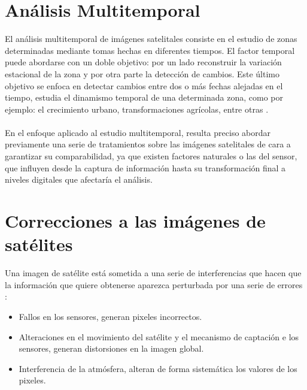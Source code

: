 \section{An\'alisis Multitemporal}
El an\'alisis multitemporal de im\'agenes satelitales consiste en el estudio de zonas determinadas mediante tomas hechas en diferentes tiempos. El factor temporal puede abordarse con un doble objetivo: por un lado reconstruir la variaci\'on estacional de la zona y por otra parte la detecci\'on de cambios. Este \'ultimo objetivo se enfoca en detectar cambios entre dos o m\'as
fechas alejadas en el tiempo, estudia el dinamismo temporal de una determinada zona, como por ejemplo: el crecimiento urbano, transformaciones agrícolas, entre otras \cite{salinero2002teledeteccion}.\\~\\
En el enfoque aplicado al estudio multitemporal, resulta preciso abordar previamente una serie de tratamientos sobre las im\'agenes satelitales de cara a garantizar su comparabilidad, ya que existen factores naturales o las del sensor, que influyen desde la captura de informaci\'on hasta su transformaci\'on final a niveles digitales que afectar\'ia el an\'alisis.

\section{Correcciones a las im\'agenes de sat\'elites}
Una imagen de sat\'elite est\'a sometida a una serie de interferencias que hacen que la informaci\'on que quiere obtenerse aparezca perturbada por una serie de errores \cite{teledUm}:
	\begin{itemize}
		\item Fallos en los sensores, generan pixeles incorrectos.
		\item Alteraciones en el movimiento del sat\'elite y el mecanismo de captaci\'on e los sensores, generan
		distorsiones en la imagen global.
		\item Interferencia de la atm\'osfera, alteran de forma sistem\'atica los valores de los pixeles.
	\end{itemize}


